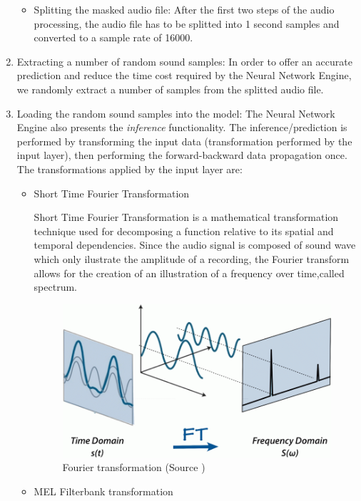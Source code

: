 \begin{enumerate}
\begin{itemize}
			\item Splitting the masked audio file: After the first two steps of the audio processing,
	the audio file has to be splitted into 1 second samples and converted to a sample rate of 16000.
		\end{itemize}

	\item Extracting a number of random sound samples: In order to offer an accurate prediction and reduce the
	time cost required by the Neural Network Engine, we randomly extract a number of samples from the splitted audio
	file.
\item Loading the random sound samples into the model: The Neural Network Engine also presents the \textit{inference}
	functionality. The inference/prediction is performed by transforming the input data (transformation performed
	by the input layer), then performing the forward-backward data propagation once.
	The transformations applied by the input layer are:
	\begin{itemize}

		\item Short Time Fourier Transformation

		Short Time Fourier Transformation is a mathematical transformation technique used for
		decomposing a function relative to its spatial and temporal dependencies. Since the audio signal is
		composed of sound wave which only ilustrate the amplitude of
		a recording, the Fourier transform allows for the creation of an illustration of a frequency
		over time,called spectrum. \cite{ft}

			\begin{figure}[H]
				\centering
				\includegraphics[width = 4.5in]{images/ft.png}
				\caption{Fourier transformation (Source \cite{ft})}
			\label{ft}
			\end{figure}


		\item MEL Filterbank transformation


\end{itemize}
\end{enumerate}
